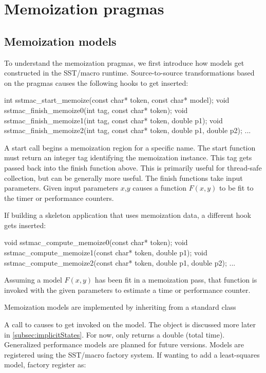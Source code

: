 
\section{Memoization pragmas}\label{sec:memoization}

\subsection{Memoization models}
To understand the memoization pragmas, we first introduce how models get constructed in the SST/macro runtime.
Source-to-source transformations based on the pragmas causes the following hooks to get inserted:

\begin{CppCode}
int sstmac_start_memoize(const char* token, const char* model);
void sstmac_finish_memoize0(int tag, const char* token);
void sstmac_finish_memoize1(int tag, const char* token, double p1);
void sstmac_finish_memoize2(int tag, const char* token, double p1, double p2);
...
\end{CppCode}
A start call begins a memoization region for a specific name.
The start function must return an integer tag identifying the memoization instance.
This tag gets passed back into the finish function above.
This is primarily useful for thread-safe collection, but can be generally more useful.
The finish functions take input parameters. 
Given input parameters $x$,$y$ causes a function $F(x,y)$ to be fit to the timer or performance counters.

If building a skeleton application that uses memoization data, a different hook gets inserted:
\begin{CppCode}
void sstmac_compute_memoize0(const char* token);
void sstmac_compute_memoize1(const char* token, double p1);
void sstmac_compute_memoize2(const char* token, double p1, double p2);
...
\end{CppCode}
Assuming a model $F(x,y)$ has been fit in a memoization pass,
that function is invoked with the given parameters to estimate a time or performance counter.

Memoization models are implemented by inheriting from a standard class

\begin{CppCode}
struct RegressionModel {
...
virtual double compute(int n_params, const double params[], ImplicitState* state) = 0;
virtual int StartCollection() = 0;
virtual void finishCollection(int n_params, const double params[], ImplicitState* state) = 0;
...
\end{CppCode}
A call to  causes  to get invoked on the model.
The  object is discussed more later in \ref{subsec:implicitStates}.
For now,  only returns a double (total time).
Generalized performance models are planned for future versions.
Models are registered using the SST/macro factory system. 
If wanting to add a least-squares model, factory register as:

